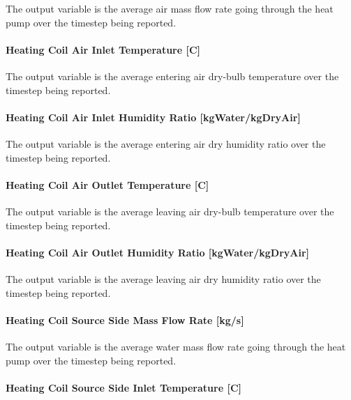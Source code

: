 The output variable is the average air mass flow rate going through the heat pump over the timestep being reported.

\paragraph{Heating Coil Air Inlet Temperature {[}C{]}}\label{heating-coil-air-inlet-temperature-c-1}

The output variable is the average entering air dry-bulb temperature over the timestep being reported.

\paragraph{Heating Coil Air Inlet Humidity Ratio {[}kgWater/kgDryAir{]}}\label{heating-coil-air-inlet-humidity-ratio-kgwaterkgdryair-1}

The output variable is the average entering air dry humidity ratio over the timestep being reported.

\paragraph{Heating Coil Air Outlet Temperature {[}C{]}}\label{heating-coil-air-outlet-temperature-c-1}

The output variable is the average leaving air dry-bulb temperature over the timestep being reported.

\paragraph{Heating Coil Air Outlet Humidity Ratio {[}kgWater/kgDryAir{]}}\label{heating-coil-air-outlet-humidity-ratio-kgwaterkgdryair-1}

The output variable is the average leaving air dry humidity ratio over the timestep being reported.

\paragraph{Heating Coil Source Side Mass Flow Rate {[}kg/s{]}}\label{heating-coil-source-side-mass-flow-rate-kgs}

The output variable is the average water mass flow rate going through the heat pump over the timestep being reported.

\paragraph{Heating Coil Source Side Inlet Temperature {[}C{]}}\label{heating-coil-source-side-inlet-temperature-c}

